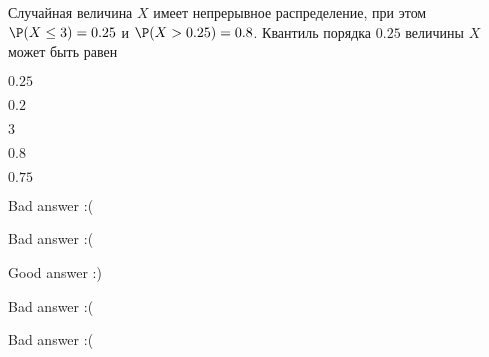 
\begin{question}
Случайная величина \(X\) имеет непрерывное распределение, при этом
\(\P(X\leq 3)=0.25\) и \(\P(X>0.25)=0.8\). Квантиль порядка \(0.25\)
величины \(X\) может быть равен
\begin{answerlist}
  \item \(0.25\)
  \item \(0.2\)
  \item \(3\)
  \item \(0.8\)
  \item \(0.75\)
\end{answerlist}
\end{question}

\begin{solution}
\begin{answerlist}
  \item Bad answer :(
  \item Bad answer :(
  \item Good answer :)
  \item Bad answer :(
  \item Bad answer :(
\end{answerlist}
\end{solution}

